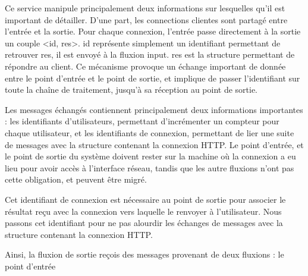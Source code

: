 Ce service manipule principalement deux informations sur lesquelles qu'il est important de détailler.
D'une part, les connections clientes sont partagé entre l'entrée et la sortie.
Pour chaque connexion, l'entrée passe directement à la sortie un couple <id, res>.
id représente simplement un identifiant permettant de retrouver res, il est envoyé à la fluxion input.
res est la structure permettant de répondre au client.
Ce mécanisme provoque un échange important de donnée entre le point d'entrée et le point de sortie, et implique de passer l'identifiant sur toute la chaîne de traitement, jusqu'à sa réception au point de sortie.

Les messages échangés contiennent principalement deux informations importantes : les identifiants d'utilisateurs, permettant d'incrémenter un compteur pour chaque utilisateur, et les identifiants de connexion, permettant de lier une suite de messages avec la structure contenant la connexion HTTP.
Le point d'entrée, et le point de sortie du système doivent rester sur la machine où la connexion a eu lieu pour avoir accès à l'interface réseau, tandis que les autre fluxions n'ont pas cette obligation, et peuvent être migré.


Cet identifiant de connexion est nécessaire au point de sortie pour associer le résultat reçu avec la connexion vers laquelle le renvoyer à l'utilisateur.
Nous passons cet identifiant pour ne pas alourdir les échanges de messages avec la structure contenant la connexion HTTP.

Ainsi, la fluxion de sortie reçois des messages provenant de deux fluxions : le point d'entrée




